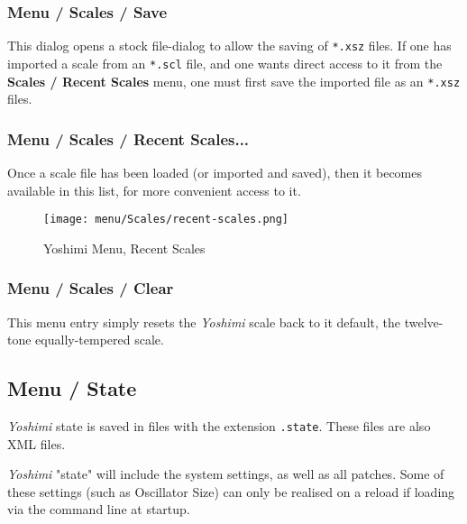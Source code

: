 \subsubsection{Menu / Scales / Save}
\label{subsec:menu_scales_save}

   This dialog opens a stock file-dialog to allow the saving of
   \texttt{*.xsz} files.
   If one has imported a scale from an \texttt{*.scl} file, and one
   wants direct access to it from the \textbf{Scales / Recent Scales} menu, one
   must first save the imported file as an \texttt{*.xsz} files.

\subsubsection{Menu / Scales / Recent Scales...}
\label{subsec:menu_scales_recent_scales}

   Once a scale file has been loaded (or imported and saved), then it
   becomes available in this list, for more convenient access to it.

\begin{figure}[H]
   \centering 
   \texttt{[image: menu/Scales/recent-scales.png]}
   \caption{Yoshimi Menu, Recent Scales}
   \label{fig:yoshimi_menu_recent_scales}
\end{figure}

\subsubsection{Menu / Scales / Clear}
\label{subsec:menu_scales_clear}

   This menu entry simply resets the \textsl{Yoshimi} scale back to it default,
   the twelve-tone equally-tempered scale.

\subsection{Menu / State}
\label{subsec:menu_state}

   \textsl{Yoshimi} state is saved in files with the extension
   \texttt{.state}.  These files are also XML files.

   \textsl{Yoshimi} "state" will include the system settings, as well as all
   patches. Some of these settings (such as Oscillator Size) can only be
   realised on a reload if loading via the command line at startup.


